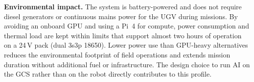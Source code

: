 \textbf{Environmental impact.} The system is battery-powered and does not require diesel generators or continuous mains power for the UGV during missions. By avoiding an onboard GPU and using a Pi~4 for compute, power consumption and thermal load are kept within limits that support almost two hours of operation on a 24\,V pack (dual 3s3p 18650). Lower power use than GPU-heavy alternatives reduces the environmental footprint of field operations and extends mission duration without additional fuel or infrastructure. The design choice to run AI on the GCS rather than on the robot directly contributes to this profile.
